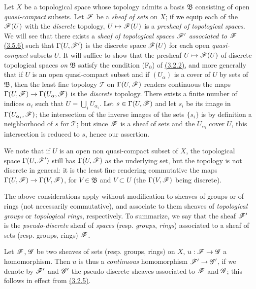 \begin{env}[3.8.1]
\label{0.3.8.1}
Let $X$ be a topological space whose topology admits a basis $\mathfrak{B}$
consisting of open {\em quasi-compact} subsets. Let $\mathscr{F}$ be a {\em sheaf
of sets} on $X$; if we equip each of the $\mathscr{F}(U)$ with the {\em discrete}
topology, $U\mapsto\mathscr{F}(U)$ is a {\em presheaf of topological spaces}. We
will see that there exists a {\em sheaf of topological spaces $\mathscr{F}'$
associated to $\mathscr{F}$} \hyperref[0.3.5.6]{(3.5.6)} such that $\Gamma(U,\mathscr{F}')$ is the
discrete space $\mathscr{F}(U)$ for each open {\em quasi-compact} subsets $U$. It
will suffice to show that the presheaf $U\mapsto\mathscr{F}(U)$ of discrete
topological spaces {\em on} $\mathfrak{B}$ satisfy the condition (F$_0$) of
\hyperref[0.3.2.2]{(3.2.2)}, and more generally that if $U$ is an open quasi-compact
subset and if $(U_\alpha)$ is a cover of $U$ by sets of $\mathfrak{B}$, then the
least fine topology $\mathcal{T}$ on $\Gamma(U,\mathscr{F})$ renders continuous the
maps $\Gamma(U,\mathscr{F})\to\Gamma(U_\alpha,\mathscr{F})$ is the {\em discrete}
topology. There exists a finite number of indices $\alpha_i$ such that
$U=\bigcup_i U_{\alpha_i}$. Let $s\in\Gamma(U,\mathscr{F})$ and let $s_i$ be its
image in $\Gamma(U_{\alpha_i},\mathscr{F})$; the intersection of the inverse images
of the sets $\{s_i\}$ is by definition a neighborhood of $s$ for $\mathcal{T}$;
but since $\mathscr{F}$ is a sheaf of sets and the $U_{\alpha_i}$ cover $U$, this
intersection is reduced to $s$, hence our assertion.

We note that if $U$ is an open non quasi-compact subset of $X$, the topological
space $\Gamma(U,\mathscr{F}')$ still has $\Gamma(U,\mathscr{F})$ as the underlying set,
but the topology is not discrete in general: it is the least fine rendering
commutative the maps $\Gamma(U,\mathscr{F})\to\Gamma(V,\mathscr{F})$, for
$V\in\mathfrak{B}$ and $V\subset U$ (the $\Gamma(V,\mathscr{F})$ being discrete).

The above considerations apply without modification to sheaves of groups or of
rings (not necessarily commutative), and associate to them sheaves of
{\em topological groups} or {\em topological rings}, respectively. To
summarize, we say that the sheaf $\mathscr{F}'$ is the {\em pseudo-discrete} sheaf
of {\em spaces} (resp. {\em groups}, {\em rings}) associated to a sheaf of
sets (resp. groups, rings) $\mathscr{F}$.
\end{env}

\begin{env}[3.8.2]
\label{0.3.8.2}
Let $\mathscr{F}$, $\mathscr{G}$ be two sheaves of sets (resp. groups, rings) on $X$,
$u:\mathscr{F}\to\mathscr{G}$ a homomorphism. Then $u$ is thus a {\em continuous}
homomorphism $\mathscr{F}'\to\mathscr{G}'$, if we denote by $\mathscr{F}'$ and $\mathscr{G}'$ the
pseudo-discrete sheaves associated to $\mathscr{F}$ and $\mathscr{G}$; this follows in
effect from \hyperref[0.3.2.5]{(3.2.5)}.
\end{env}

